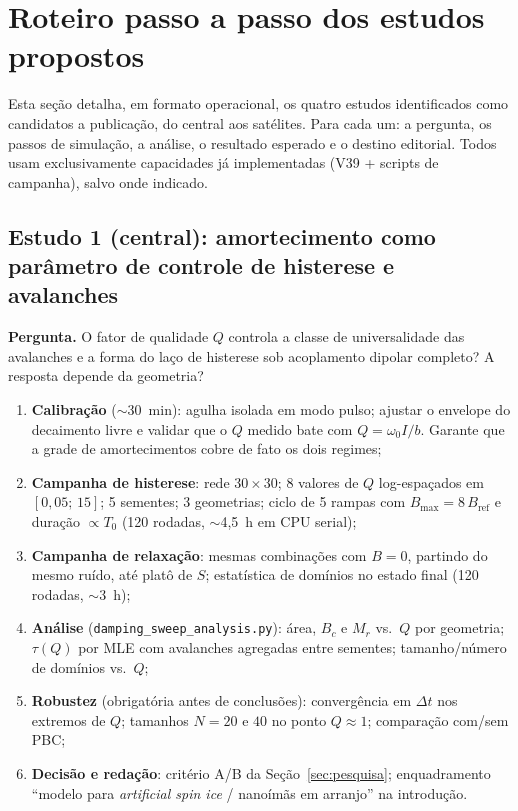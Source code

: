 \documentclass[11pt,a4paper]{article}
\newcommand{\code}[1]{\texttt{#1}}
\begin{document}
\section{Roteiro passo a passo dos estudos propostos}
\label{sec:roteiro}

Esta seção detalha, em formato operacional, os quatro estudos
identificados como candidatos a publicação, do central aos satélites.
Para cada um: a pergunta, os passos de simulação, a análise, o resultado
esperado e o destino editorial. Todos usam exclusivamente capacidades já
implementadas (V39 + scripts de campanha), salvo onde indicado.

\subsection{Estudo 1 (central): amortecimento como parâmetro de
controle de histerese e avalanches}

\textbf{Pergunta.} O fator de qualidade $Q$ controla a classe de
universalidade das avalanches e a forma do laço de histerese sob
acoplamento dipolar completo? A resposta depende da geometria?

\begin{enumerate}
\item \textbf{Calibração} ($\sim$30~min): agulha isolada em modo pulso;
ajustar o envelope do decaimento livre e validar que o $Q$ medido bate
com $Q = \omega_0 I / b$. Garante que a grade de amortecimentos cobre de
fato os dois regimes;
\item \textbf{Campanha de histerese}: rede $30\times30$; 8 valores de
$Q$ log-espaçados em $[0{,}05;\,15]$; 5 sementes; 3 geometrias; ciclo de
5 rampas com $B_{\max} = 8\,B_{\mathrm{ref}}$ e duração $\propto T_0$
(120 rodadas, $\sim$4{,}5~h em CPU serial);
\item \textbf{Campanha de relaxação}: mesmas combinações com $B = 0$,
partindo do mesmo ruído, até platô de $S$; estatística de domínios no
estado final (120 rodadas, $\sim$3~h);
\item \textbf{Análise} (\code{damping\_sweep\_analysis.py}): área,
$B_c$ e $M_r$ vs.\ $Q$ por geometria; $\tau(Q)$ por MLE com avalanches
agregadas entre sementes; tamanho/número de domínios vs.\ $Q$;
\item \textbf{Robustez} (obrigatória antes de conclusões): convergência
em $\Delta t$ nos extremos de $Q$; tamanhos $N = 20$ e $40$ no ponto
$Q \approx 1$; comparação com/sem PBC;
\item \textbf{Decisão e redação}: critério A/B da
Seção~\ref{sec:pesquisa}; enquadramento ``modelo para \emph{artificial
spin ice} / nanoímãs em arranjo'' na introdução.
\end{enumerate}
\end{document}
